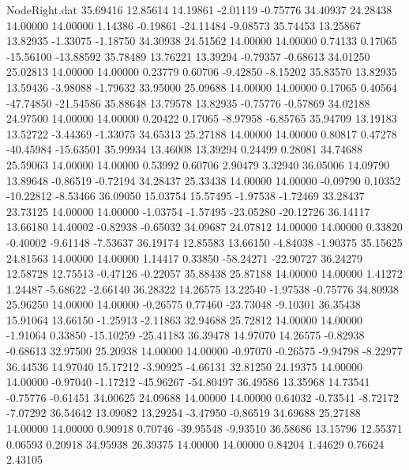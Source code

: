 \begin{filecontents}{NodeRight.dat}
  35.69416   12.85614   14.19861    -2.01119   -0.75776   34.40937   24.28438   14.00000   14.00000    1.14386   -0.19861  -24.11484   -9.08573
  35.74453   13.25867   13.82935    -1.33075   -1.18750   34.30938   24.51562   14.00000   14.00000    0.74133    0.17065  -15.56100  -13.88592
  35.78489   13.76221   13.39294    -0.79357   -0.68613   34.01250   25.02813   14.00000   14.00000    0.23779    0.60706   -9.42850   -8.15202
  35.83570   13.82935   13.59436    -3.98088   -1.79632   33.95000   25.09688   14.00000   14.00000    0.17065    0.40564  -47.74850  -21.54586
  35.88648   13.79578   13.82935    -0.75776   -0.57869   34.02188   24.97500   14.00000   14.00000    0.20422    0.17065   -8.97958   -6.85765
  35.94709   13.19183   13.52722    -3.44369   -1.33075   34.65313   25.27188   14.00000   14.00000    0.80817    0.47278  -40.45984  -15.63501
  35.99934   13.46008   13.39294     0.24499    0.28081   34.74688   25.59063   14.00000   14.00000    0.53992    0.60706    2.90479    3.32940
  36.05006   14.09790   13.89648    -0.86519   -0.72194   34.28437   25.33438   14.00000   14.00000   -0.09790    0.10352  -10.22812   -8.53466
  36.09050   15.03754   15.57495    -1.97538   -1.72469   33.28437   23.73125   14.00000   14.00000   -1.03754   -1.57495  -23.05280  -20.12726
  36.14117   13.66180   14.40002    -0.82938   -0.65032   34.09687   24.07812   14.00000   14.00000    0.33820   -0.40002   -9.61148   -7.53637
  36.19174   12.85583   13.66150    -4.84038   -1.90375   35.15625   24.81563   14.00000   14.00000    1.14417    0.33850  -58.24271  -22.90727
  36.24279   12.58728   12.75513    -0.47126   -0.22057   35.88438   25.87188   14.00000   14.00000    1.41272    1.24487   -5.68622   -2.66140
  36.28322   14.26575   13.22540    -1.97538   -0.75776   34.80938   25.96250   14.00000   14.00000   -0.26575    0.77460  -23.73048   -9.10301
  36.35438   15.91064   13.66150    -1.25913   -2.11863   32.94688   25.72812   14.00000   14.00000   -1.91064    0.33850  -15.10259  -25.41183
  36.39478   14.97070   14.26575    -0.82938   -0.68613   32.97500   25.20938   14.00000   14.00000   -0.97070   -0.26575   -9.94798   -8.22977
  36.44536   14.97040   15.17212    -3.90925   -4.66131   32.81250   24.19375   14.00000   14.00000   -0.97040   -1.17212  -45.96267  -54.80497
  36.49586   13.35968   14.73541    -0.75776   -0.61451   34.00625   24.09688   14.00000   14.00000    0.64032   -0.73541   -8.72172   -7.07292
  36.54642   13.09082   13.29254    -3.47950   -0.86519   34.69688   25.27188   14.00000   14.00000    0.90918    0.70746  -39.95548   -9.93510
  36.58686   13.15796   12.55371     0.06593    0.20918   34.95938   26.39375   14.00000   14.00000    0.84204    1.44629    0.76624    2.43105

\end{filecontents}
